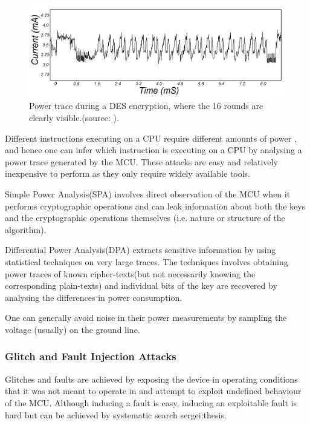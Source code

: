 	\label{subsubsec:power_analysis}

	\begin{figure}
		\center
		\includegraphics[scale=0.7]{img/power_des.png}
		\caption{\footnotesize Power trace during a DES encryption, where the 16 rounds are clearly visible.(source: \protect\citep{kocher:DPA}).}
		\label{fig:des_power}		
	\end{figure}

	Different instructions executing on a CPU require different amounts of power \citep{website:riscure}\citep{kocher:DPA}, and hence one can infer which instruction is executing on a CPU by analysing a power trace generated by the MCU. These attacks are easy and relatively inexpensive to perform as they only require widely available tools.
	
	Simple Power Analysis(SPA) involves direct observation of the MCU when it performs cryptographic operations and can leak information about both the keys and the cryptographic operations themselves (i.e. nature or structure of the algorithm)\citep{kocher:DPA}\citep{anderson:tamper_resistance}. 

	Differential Power Analysis(DPA) extracts sensitive information by using statistical techniques on very large traces. The techniques involves obtaining power traces of known cipher-texts(but not necessarily knowing the corresponding plain-texts) and individual bits of the key are recovered by analysing the differences in power consumption\citep{kocher:DPA}\citep{anderson:tamper_resistance}.
	
	One can generally avoid noise in their power measurements by sampling the voltage (usually) on the ground line\citep{sergei:thesis}.

	\subsubsection{Glitch and Fault Injection Attacks}
	Glitches and faults are achieved by exposing the device in operating conditions that it was not meant to operate in and attempt to exploit undefined behaviour of the MCU\citep{sergei:thesis}\citep{avr_mega}. Although inducing a fault is easy, inducing an exploitable fault is hard but can be achieved by systematic search {sergei:thesis}\citep{glitches_paper}\citep{website:riscure}.
	
